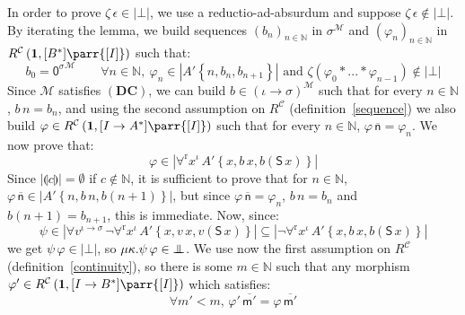 \documentclass{CSML}
\renewcommand{\ldots}{...}
\newcommand*\SortTo\to
\newcommand*\SortA{\sigma}
\newcommand*\LogSortedTerm[2]{#1^{#2}}
\newcommand*\LogVarA{x}
\newcommand*\LogVarE{v}
\newcommand*\LogConst[1]{\mathsf{#1}}
\newcommand*\LogBot\bot
\newcommand*\LogRel[1]{\llparenthesis#1\rrparenthesis}
\newcommand*\LogForallRel{\forall^\mathrm{r}}
\newcommand*\LogFormA{A}
\newcommand*\LogFormB{B}
\newcommand*\LogSubst[1]{\left\{#1\right\}}
\newcommand*\ModM{\mathcal{M}}
\newcommand*\ModElemB{b}
\newcommand*\ModElemC{c}
\newcommand*\ModMInterp[1]{{#1}^\ModM}
\newcommand*\LmSortTo\to
\newcommand*\LmConst[1]{\mathsf{#1}}
\newcommand*\LmInterpForm[1]{{#1}^*}
\newcommand*\CatC{\mathcal{C}}
\newcommand*\CatR{R}
\newcommand*\CatRC{\CatExp{\CatR}{\CatC}}
\newcommand*\CatExp[2]{#1^{#2}}
\newcommand*\CatPar\parr
\newcommand*\CatRCHomB\psi
\newcommand*\CatRCHomC\zeta
\newcommand*\CatRCHomE\varphi
\newcommand*\CatTerm{\mathbf{1}}
\newcommand*\CatInterpSort[1]{{\left[#1\right]}}
\newcommand*\RealVal[1]{\left|#1\right|}
\newcommand*\RealBot{{\bot\mkern-11mu\bot}}
\newcommand*\CASort\iota
\newcommand*\CALogZ{\LogConst{0}}
\newcommand*\CALogS{\LogConst{S}}
\newcommand*\CAAxName[1]{{\bm{\scriptstyle(#1)}}}
\newcommand*\CADCUnrelName{\CAAxName{DC}}
\newcommand*\CALmn[1]{\LmConst{\overline{#1}}}
\newcommand*\CALmnSort{I}
\newcommand*\CALmextend{\mathbin{*}}
\newcommand*\CALmnil{\epsilon}
\begin{document}
\noindent In order to prove $\CatRCHomC\,\CALmnil\in\RealVal{\LogBot}$, we use a reductio-ad-absurdum and suppose $\CatRCHomC\,\CALmnil\notin\RealVal{\LogBot}$. By iterating the lemma, we build sequences $\left(\ModElemB_n\right)_{n\in\mathbb{N}}$ in $\ModMInterp{\SortA}$ and $\left(\CatRCHomE_n\right)_{n\in\mathbb{N}}$ in $\CatRC\left(\CatTerm,\CatInterpSort{\LmInterpForm{\LogFormB}}\CatPar\CatInterpSort{\CALmnSort}\right)$ such that:
$$\ModElemB_0=\ModMInterp{\LogSortedTerm{\CALogZ}{\SortA}}\qquad\forall n\in\mathbb{N},\ \CatRCHomE_n\in\RealVal{\LogFormA'\LogSubst{n,\ModElemB_n,\ModElemB_{n+1}}}\text{ and }\CatRCHomC\left(\CatRCHomE_0\CALmextend\ldots\CALmextend\CatRCHomE_{n-1}\right)\notin\RealVal{\LogBot}$$
Since $\ModM$ satisfies $\CADCUnrelName$, we can build $\ModElemB\in\ModMInterp{\left(\CASort\SortTo\SortA\right)}$ such that for every $n\in\mathbb{N}$, $\ModElemB\,n=\ModElemB_n$, and using the second assumption on $\CatRC$ (definition~\ref{sequence}) we also build $\CatRCHomE\in\CatRC\left(\CatTerm,\CatInterpSort{\CALmnSort\LmSortTo\LmInterpForm{\LogFormA}}\CatPar\CatInterpSort{\CALmnSort}\right)$ such that for every $n\in\mathbb{N}$, $\CatRCHomE\,\CALmn{n}=\CatRCHomE_n$. We now prove that:
$$\CatRCHomE\in\RealVal{\LogForallRel\LogSortedTerm{\LogVarA}{\CASort}\,\LogFormA'\LogSubst{\LogVarA,\ModElemB\,\LogVarA,\ModElemB\left(\CALogS\,\LogVarA\right)}}$$
Since $\RealVal{\LogRel{\ModElemC}}=\emptyset$ if $\ModElemC\notin\mathbb{N}$, it is sufficient to prove that for $n\in\mathbb{N}$, $\CatRCHomE\,\CALmn{n}\in\RealVal{\LogFormA'\LogSubst{n,\ModElemB\,n,\ModElemB\left(n+1\right)}}$, but since $\CatRCHomE\,\CALmn{n}=\CatRCHomE_n$, $\ModElemB\,n=\ModElemB_n$ and $\ModElemB\left(n+1\right)=\ModElemB_{n+1}$, this is immediate. Now, since:
$$\CatRCHomB\in\RealVal{\forall\LogSortedTerm{\LogVarE}{\CASort\to\SortA}\,\neg\LogForallRel\LogSortedTerm{\LogVarA}{\CASort}\,\LogFormA'\LogSubst{\LogVarA,\LogVarE\,\LogVarA,\LogVarE\left(\CALogS\,\LogVarA\right)}}\subseteq\RealVal{\neg\LogForallRel\LogSortedTerm{\LogVarA}{\CASort}\,\LogFormA'\LogSubst{\LogVarA,\ModElemB\,\LogVarA,\ModElemB\left(\CALogS\,\LogVarA\right)}}$$
we get $\CatRCHomB\,\CatRCHomE\in\RealVal{\LogBot}$, so $\mu\kappa.\CatRCHomB\,\CatRCHomE\in\RealBot$. We use now the first assumption on $\CatRC$ (definition~\ref{continuity}), so there is some $m\in\mathbb{N}$ such that any morphism $\CatRCHomE'\in\CatRC\left(\CatTerm,\CatInterpSort{\CALmnSort\LmSortTo\LmInterpForm{\LogFormB}}\CatPar\CatInterpSort{\CALmnSort}\right)$ which satisfies:
$$\forall m'<m,\,\CatRCHomE'\,\CALmn{m'}=\CatRCHomE\,\CALmn{m'}$$
\end{document}
